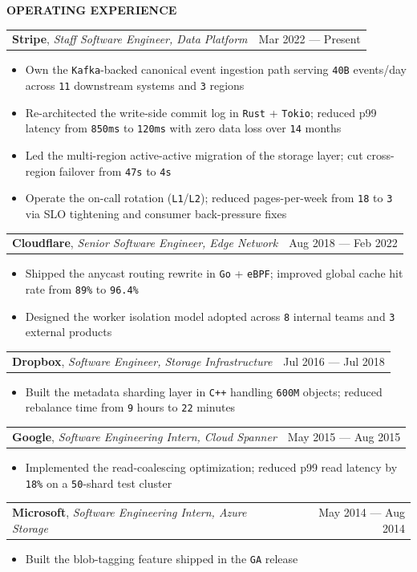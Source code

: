 \documentclass[letterpaper,9.5pt]{article}
\makeatletter
\newcommand{\fhead}[1]{%
  \vspace{10pt}
  {\bfseries\fontsize{10}{12}\selectfont\textcolor{fndrBody}{\MakeUppercase{#1}}}
  \vspace{4pt}
}
\newcommand{\frole}[3]{%
  \vspace{2pt}
  \begin{tabularx}{\linewidth}{@{}Xr@{}}
    \textbf{#1}, \textit{#2} & \ttfamily\textcolor{fndrSec}{#3} \\
  \end{tabularx}
  \vspace{1pt}
}
\newcommand{\m}[1]{\texttt{\small #1}}
\makeatother
\begin{document}
{%
\fhead{Operating Experience}

\frole{Stripe}{Staff Software Engineer, Data Platform}{Mar 2022 --- Present}
\begin{itemize}
  \item Own the \m{Kafka}-backed canonical event ingestion path serving \m{40B} events/day across \m{11} downstream systems and \m{3} regions
  \item Re-architected the write-side commit log in \m{Rust} + \m{Tokio}; reduced p99 latency from \m{850ms} to \m{120ms} with zero data loss over \m{14} months
  \item Led the multi-region active-active migration of the storage layer; cut cross-region failover from \m{47s} to \m{4s}
  \item Operate the on-call rotation (\m{L1}/\m{L2}); reduced pages-per-week from \m{18} to \m{3} via SLO tightening and consumer back-pressure fixes
\end{itemize}

\frole{Cloudflare}{Senior Software Engineer, Edge Network}{Aug 2018 --- Feb 2022}
\begin{itemize}
  \item Shipped the anycast routing rewrite in \m{Go} + \m{eBPF}; improved global cache hit rate from \m{89\%} to \m{96.4\%}
  \item Designed the worker isolation model adopted across \m{8} internal teams and \m{3} external products
\end{itemize}

\frole{Dropbox}{Software Engineer, Storage Infrastructure}{Jul 2016 --- Jul 2018}
\begin{itemize}
  \item Built the metadata sharding layer in \m{C++} handling \m{600M} objects; reduced rebalance time from \m{9} hours to \m{22} minutes
\end{itemize}

\frole{Google}{Software Engineering Intern, Cloud Spanner}{May 2015 --- Aug 2015}
\begin{itemize}
  \item Implemented the read-coalescing optimization; reduced p99 read latency by \m{18\%} on a \m{50}-shard test cluster
\end{itemize}

\frole{Microsoft}{Software Engineering Intern, Azure Storage}{May 2014 --- Aug 2014}
\begin{itemize}
  \item Built the blob-tagging feature shipped in the \m{GA} release
\end{itemize}

}
\end{document}
